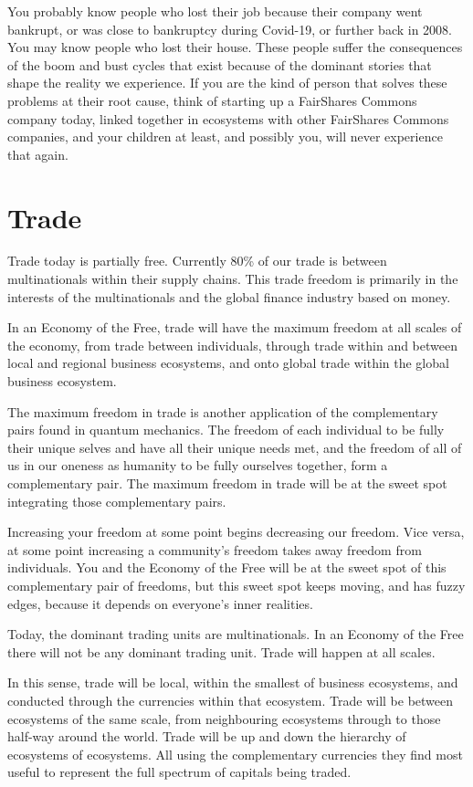You probably know people who lost their job because their company went bankrupt, or was close to bankruptcy during Covid-19,  or further back in 2008. You may know people who lost their house. These people suffer the consequences of the boom and bust cycles that exist because of the dominant stories that shape the reality we experience. If you are the kind of person that solves these problems at their root cause, think of starting up a FairShares Commons company today, linked together in ecosystems with other FairShares Commons companies, and your children at least, and possibly you, will never experience that again.
\section{Trade}
Trade today is partially free. Currently 80\% of our trade is between multinationals  within their supply chains. This trade freedom is primarily in the interests of the multinationals and the global finance industry based on money.


In an Economy of the Free,  trade will have the maximum freedom at all scales of the economy, from trade between individuals, through trade within and between local and regional business ecosystems, and onto global trade within the global business ecosystem.


The maximum freedom in trade is another application of the complementary pairs found in quantum mechanics. The freedom of each individual to be fully their unique selves and have all their unique needs met, and the freedom of all of us in our oneness as humanity to be fully ourselves together, form a complementary pair. The maximum freedom in trade will be at the sweet spot integrating those complementary pairs. 


Increasing your freedom at some point begins decreasing our freedom. Vice versa, at some point increasing a community’s freedom takes away freedom from individuals. You and the Economy of the Free will be at the sweet spot of this complementary pair of freedoms, but this sweet spot keeps moving, and has fuzzy edges, because it depends on everyone’s inner realities.


Today, the dominant trading units are multinationals. In an Economy of the Free there will not be any dominant trading unit. Trade will happen at all scales. 


In this sense, trade will be local, within the smallest of business ecosystems, and conducted through the currencies within that ecosystem. Trade will be between ecosystems of the same scale, from neighbouring ecosystems through to those half-way around the world. Trade will be up and down the hierarchy of ecosystems of ecosystems. All using the complementary currencies they find most useful to represent the full spectrum of capitals being traded.


